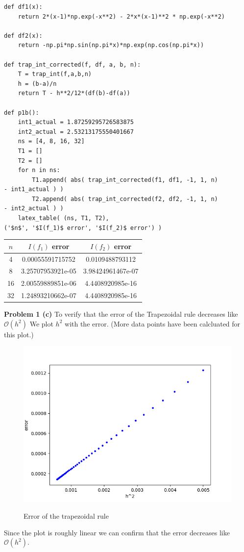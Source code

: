 \documentclass[12pt]{article}
\newcommand{\problem}[1]{\hspace{-4 ex} \large \textbf{Problem #1} }
\begin{document}
	\begin{lstlisting}
def df1(x):
	return 2*(x-1)*np.exp(-x**2) - 2*x*(x-1)**2 * np.exp(-x**2)

def df2(x):
	return -np.pi*np.sin(np.pi*x)*np.exp(np.cos(np.pi*x))

def trap_int_corrected(f, df, a, b, n):
	T = trap_int(f,a,b,n)
	h = (b-a)/n 
	return T - h**2/12*(df(b)-df(a))

def p1b():
	int1_actual = 1.87259295726583875
	int2_actual = 2.53213175550401667
	ns = [4, 8, 16, 32]
	T1 = []
	T2 = []
	for n in ns:
		T1.append( abs( trap_int_corrected(f1, df1, -1, 1, n)
- int1_actual ) )
		T2.append( abs( trap_int_corrected(f2, df2, -1, 1, n)
- int2_actual ) )
	latex_table( (ns, T1, T2), 
('$n$', '$I(f_1)$ error', '$I(f_2)$ error') ) 
	\end{lstlisting}
	
	\begin{center}
		\begin{tabular}{|c|c|c|}
			\hline
			$n$&$I(f_1)$ error&$I(f_2)$ error\\ \hline
			4&0.00055591715752&0.0109488793112\\ \hline
			8&3.25707953921e-05&3.98424961467e-07\\ \hline
			16&2.00559889851e-06&4.4408920985e-16\\ \hline
			32&1.24893210662e-07&4.4408920985e-16\\ \hline
		\end{tabular}
	\end{center}


\bigbreak
\problem{1 (c)} To verify that the error of the Trapezoidal rule decreases like $\mathcal{O}(h^2)$ We plot $h^2$ with the error. (More data points have been calcluated for this plot.)
	\begin{figure}[H]
		\caption{Error of the trapezoidal rule}
		\includegraphics[width=.75\textwidth]{hw7_p1_fig1}
		\label{p1_T_err}
		\centering
	\end{figure}
	Since the plot is roughly linear we can confirm that the error decreases like $\mathcal{O}(h^2)$. \bigbreak
\end{document}
